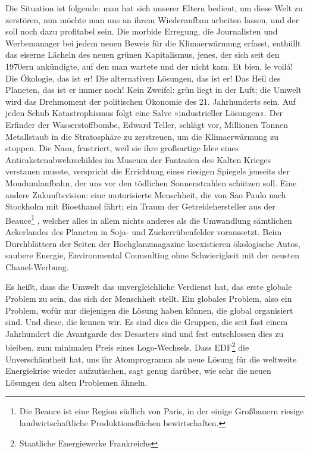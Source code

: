 Die Situation ist folgende: man hat sich unserer Eltern bedient, um
diese Welt zu zerstören, nun möchte man uns an ihrem Wiederaufbau
arbeiten lassen, und der soll noch dazu profitabel sein. Die
morbide Erregung, die Journalisten und Werbemanager bei jedem neuen
Beweis für die Klimaerwärmung erfasst, enthüllt das eiserne Lächeln
des neuen grünen Kapitalismus, jenes, der sich seit den 1970ern
ankündigte, auf den man wartete und der nicht kam. Et bien, le
voilá! Die Ökologie, das ist er! Die alternativen Lösungen, das ist
er! Das Heil des Planeten, das ist er immer noch! Kein Zweifel:
grün liegt in der Luft; die Umwelt wird das Drehmoment der
politischen Ökonomie des 21. Jahrhunderts sein. Auf jeden Schub
Katastrophismus folgt eine Salve »industrieller Lösungen«.
Der Erfinder der Wasserstoffbombe, Edward Teller, schlägt vor,
Millionen Tonnen Metallstaub in die Stratosphäre zu zerstreuen, um
die Klimaerwärmung zu stoppen. Die Nasa, frustriert, weil sie ihre
großsartige Idee eines Antiraketenabwehrschildes im Museum der
Fantasien des Kalten Krieges verstauen musste, verspricht die
Errichtung eines riesigen Spiegels jenseits der Mondumlaufbahn, der
uns vor den tödlichen Sonnenstrahlen schützen soll. Eine andere
Zukunftsvision: eine motorisierte Menschheit, die von Sao Paulo
nach Stockholm mit Bioethanol fährt; ein Traum der
Getreidehersteller aus der Beauce\footnote{
Die Beauce ist eine Region südlich von Paris, in der einige
Großbauern riesige landwirtschaftliche Produktionsflächen
bewirtschaften.
}%
, welcher alles in allem nichts
anderes als die Umwandlung sämtlichen Ackerlandes des Planeten in
Soja- und Zuckerrübenfelder voraussetzt. Beim Durchblättern der
Seiten der Hochglanzmagazine koexistieren ökologische Autos,
saubere Energie, Environmental Counsulting ohne Schwierigkeit mit
der neusten Chanel-Werbung.

Es heißt, dass die Umwelt das unvergleichliche Verdienst hat, das
erste globale Problem zu sein, das sich der Menschheit stellt. Ein
globales Problem, also ein Problem, wofür nur diejenigen die Lösung
haben können, die global organisiert sind. Und diese, die kennen
wir. Es sind dies die Gruppen, die seit fast einem Jahrhundert die
Avantgarde des Desasters sind und fest entschlossen dies zu
bleiben, zum minimalen Preis eines Logo-Wechsels. Dass EDF\footnote{
Staatliche Energiewerke Frankreichs
}%
die
Unverschämtheit hat, uns ihr Atomprogramm als neue Lösung für die
weltweite Energiekrise wieder aufzutischen, sagt genug darüber, wie
sehr die neuen Lösungen den alten Problemen ähneln.

